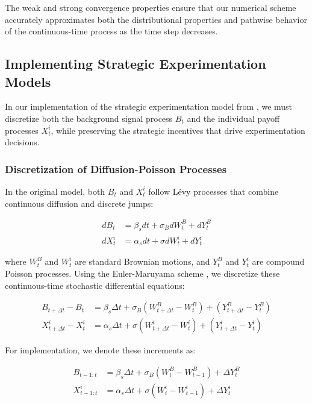 \documentclass[a4paper,12pt]{report}
\begin{document}
The weak and strong convergence properties ensure that our numerical scheme accurately approximates both the distributional properties and pathwise behavior of the continuous-time process as the time step decreases.

\subsection{Implementing Strategic Experimentation Models}
\label{appendix:strategic_experimentation_implementation}

In our implementation of the strategic experimentation model from \citet{keller2020undiscounted}, we must discretize both the background signal process $B_t$ and the individual payoff processes $X^i_t$, while preserving the strategic incentives that drive experimentation decisions.

\subsubsection{Discretization of Diffusion-Poisson Processes}
\label{appendix:discretization_diffusion_poisson}

In the original model, both $B_t$ and $X^i_t$ follow Lévy processes that combine continuous diffusion and discrete jumps:

\begin{align}
    dB_t   & = \beta_s dt + \sigma_B dW^B_t + dY^B_t \\
    dX^i_t & = \alpha_s dt + \sigma dW^i_t + dY^i_t
\end{align}

where $W^B_t$ and $W^i_t$ are standard Brownian motions, and $Y^B_t$ and $Y^i_t$ are compound Poisson processes. Using the Euler-Maruyama scheme \citep{platen2010numerical}, we discretize these continuous-time stochastic differential equations:

\begin{align}
    B_{t+\Delta t} - B_t     & = \beta_s \Delta t + \sigma_B (W^B_{t+\Delta t} - W^B_t) + (Y^B_{t+\Delta t} - Y^B_t) \\
    X^i_{t+\Delta t} - X^i_t & = \alpha_s \Delta t + \sigma (W^i_{t+\Delta t} - W^i_t) + (Y^i_{t+\Delta t} - Y^i_t)
\end{align}

For implementation, we denote these increments as:

\begin{align}
    B_{t-1:t}   & = \beta_s \Delta t + \sigma_B (W^B_t - W^B_{t-1}) + \Delta Y^B_t \\
    X^i_{t-1:t} & = \alpha_s \Delta t + \sigma (W^i_t - W^i_{t-1}) + \Delta Y^i_t
\end{align}
\end{document}
